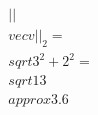 \documentclass[preview]{standalone}
\begin{document}
\begin{align*}
||\\vec{v}||_2 = \\sqrt{3^2 + 2^2} = \\sqrt{13} \\approx 3.6
\end{align*}
\end{document}
